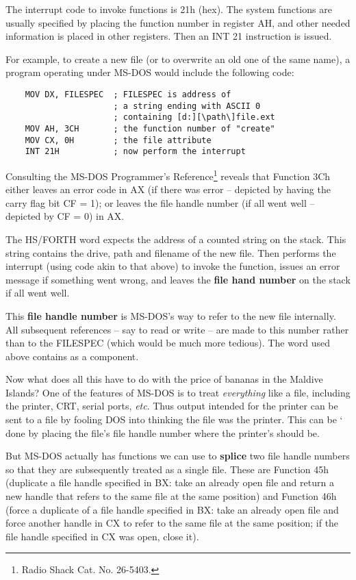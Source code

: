 The interrupt code to invoke functions is 21h (hex).
The system functions are usually specified by placing the function number in register AH, and other needed information is placed in other registers. Then an INT 21 instruction is issued.

For example, to create a new file (or to overwrite an old one of the same name), a program operating under MS-DOS would include the following code:

\begin{lstlisting}
    MOV DX, FILESPEC  ; FILESPEC is address of
                      ; a string ending with ASCII 0
                      ; containing [d:][\path\]file.ext
    MOV AH, 3CH       ; the function number of "create"
    MOV CX, 0H        ; the file attribute
    INT 21H           ; now perform the interrupt
\end{lstlisting}

Consulting the MS-DOS Programmer's Reference\footnote{Radio Shack Cat. No. 26-5403.} reveals that Function 3Ch either leaves an error code in AX (if there was error -- depicted by having the carry flag bit CF = 1); or leaves the file handle number (if all went well -- depicted by CF = 0) in AX.

The HS/FORTH word  expects the address of a counted string on the stack. This string contains the drive, path and filename of the new file. Then  performs the interrupt (using code akin to that above) to invoke the function, issues an error message if something went wrong, and leaves the \textbf{file hand number} on the stack if all went well.

This \textbf{file handle number} is MS-DOS's way to refer to the new file internally. All subsequent references -- say to read or write -- are made to this number rather than to the FILESPEC (which would be much more tedious). The word  used above contains  as a component.

Now what does all this have to do with the price of bananas in the Maldive Islands? One of the features of MS-DOS is to treat \textit{everything} like a file, including the printer, CRT, serial ports, \textit{etc}. Thus output intended for the printer can be sent to a file by fooling DOS into thinking the file was the printer. This can be ‘ done by placing the file’s file handle number where the printer’s should be.

But MS-DOS actually has functions we can use to \textbf{splice} two file handle numbers so that they are subsequently treated as a single file. These are Function 45h (duplicate a file handle specified in BX: take an already open file and return a new handle that refers to the same file at the same position) and Function 46h (force a duplicate of a file handle specified in BX: take an already open file and force another handle in CX to refer to the same file at the same position; if the file handle specified in CX was open, close it).

